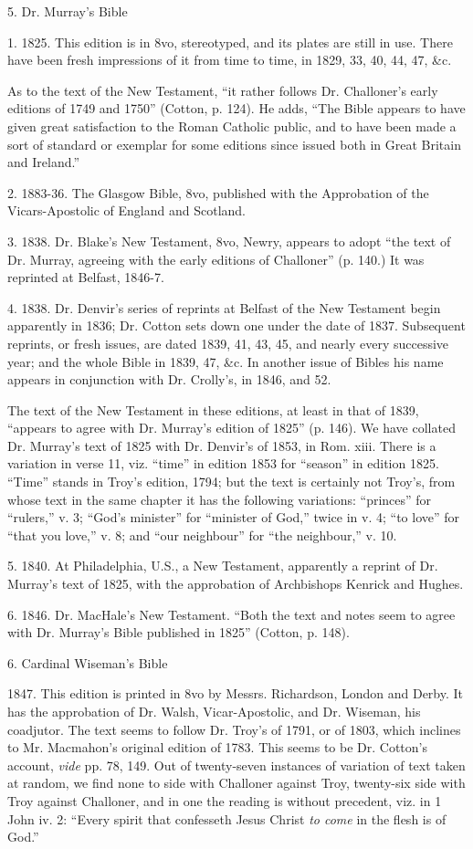 5. Dr. Murray's Bible

1. 1825. This edition is in 8vo, stereotyped, and its plates are
still in use. There have been fresh impressions of it from time to
time, in 1829, 33, 40, 44, 47, \&c.

As to the text of the New Testament, ``it rather follows Dr.
Challoner's early editions of 1749 and 1750'' (Cotton, p. 124). He
adds, ``The Bible appears to have given great satisfaction to the
Roman Catholic public, and to have been made a sort of standard or
exemplar for some editions since issued both in Great Britain and
Ireland.''

2. 1883-36. The Glasgow Bible, 8vo, published with the Approbation
of the Vicars-Apostolic of England and Scotland.

3. 1838. Dr. Blake's New Testament, 8vo, Newry, appears to adopt
``the text of Dr. Murray, agreeing with the early editions of
Challoner'' (p. 140.) It was reprinted at Belfast, 1846-7.

4. 1838. Dr. Denvir's series of reprints at Belfast of the
New Testament begin apparently in 1836; Dr. Cotton sets down one under
the date of 1837. Subsequent reprints, or fresh issues, are dated
1839, 41, 43, 45, and nearly every successive year; and the whole
Bible in 1839, 47, \&c. In another issue of Bibles his name appears
in conjunction with Dr. Crolly's, in 1846, and 52.

The text of the New Testament in these editions, at least in that
of 1839, ``appears to agree with Dr. Murray's edition of
1825'' (p. 146). We have collated Dr. Murray's text of 1825 with
Dr. Denvir's of 1853, in Rom. xiii. There is a variation in verse 11,
viz. ``time'' in edition 1853 for ``season'' in
edition 1825. ``Time'' stands in Troy's edition, 1794; but the
text is certainly not Troy's, from whose text in the same chapter it
has the following variations: ``princes'' for
``rulers,'' v. 3; ``God's minister'' for
``minister of God,'' twice in v. 4; ``to love'' for
``that you love,'' v. 8; and ``our neighbour'' for
``the neighbour,'' v. 10.

5. 1840. At Philadelphia, U.S., a New Testament, apparently a
reprint of Dr. Murray's text of 1825, with the approbation of
Archbishops Kenrick and Hughes.

6. 1846. Dr. MacHale's New Testament. ``Both the text and notes
seem to agree with Dr. Murray's Bible published in 1825'' (Cotton,
p. 148).

6. Cardinal Wiseman's Bible

1847. This edition is printed in 8vo by Messrs. Richardson, London
and Derby. It has the approbation of Dr. Walsh, Vicar-Apostolic, and
Dr. Wiseman, his coadjutor. The text seems to follow Dr. Troy's
of 1791, or of 1803, which inclines to Mr. Macmahon's original edition
of 1783. This seems to be Dr. Cotton's account, \emph{vide} pp. 78,
149. Out of twenty-seven instances of variation of text taken at
random, we find none to side with Challoner against Troy, twenty-six
side with Troy against Challoner, and in one the reading is without
precedent, viz. in 1 John iv. 2: ``Every spirit that confesseth
Jesus Christ \emph{to come} in the flesh is of God.''

